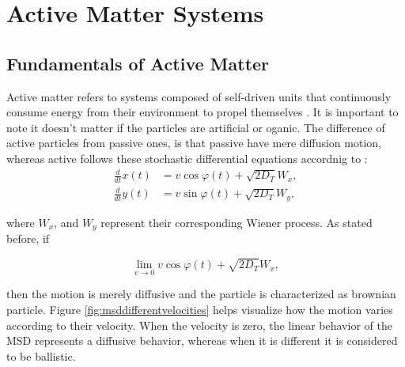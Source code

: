 \chapter{Active Matter Systems}
\label{ch:activeandpassivemattersystems}

\section{Fundamentals of Active Matter}

Active matter refers to systems composed of self-driven units that continuously consume energy from their environment to propel themselves \cite{marchetti2013hydrodynamics, ramaswamy2010mechanics}. It is important to note it doesn't matter if the particles are artificial or oganic. The difference of active particles from passive ones, is that passive have mere diffusion motion, whereas active follows these stochastic differential equations accordnig to \cite{volpe2014simulation}:
\begin{align}
  \frac{d}{dt}x(t) &= v\cos{\varphi(t)} + \sqrt{2D_T}W_x,\\
  \frac{d}{dt}y(t) &= v\sin{\varphi(t)} + \sqrt{2D_T}W_y,
  \label{eq:activestochasticequation}
\end{align}

where $W_x$, and $W_y$ represent their corresponding Wiener process. As stated before, if 

\begin{equation}
  \lim_{v \to 0}  v\cos{\varphi(t)} + \sqrt{2D_T}W_x,
  \label{eq:limitofvelocity}
\end{equation}

then the motion is merely diffusive and the particle is characterized as brownian particle. Figure \ref{fig:msddifferentvelocities} helps visualize how  the motion varies according to their velocity. When the velocity is zero, the linear behavior of the MSD represents a diffusive behavior, whereas when it is different it is considered to be ballistic. 


